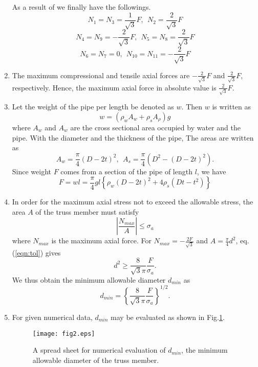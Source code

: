 \documentclass[10pt,a4j]{article}
\begin{document}
\begin{enumerate}
	As a result of we finally have the followings. 
	\[
		N_1=N_3=\frac{1}{\sqrt{3}}F ,\ \ N_2=\frac{2}{\sqrt{3}}F
	\]
	\[
		N_4=N_9=-\frac{2}{\sqrt{3}}F ,\ \ N_5=N_8=\frac{2}{\sqrt{3}}F
	\]
	\[
		N_6=N_7=0, \ \ N_{10}=N_{11}=-\frac{2}{\sqrt{3}}F
	\]
\item
	The maximum compressional and tensile axial forces are $-\frac{2}{\sqrt{3}}F$ 
	and $\frac{2}{\sqrt{3}}F$, respectively.
	Hence, the maximum axial force in absolute value is $\frac{2}{\sqrt{3}}F$.
\item
	Let the weight of the pipe per length be denoted as $w$. Then $w$ is written as 
	\begin{equation}
		w= \left( \rho_w A_w + \rho_s A_\rho \right)g
		\label{eqn:}
	\end{equation}
	where $A_w$ and $A_w$ are the cross sectional area occupied by 
	water and the pipe.
	With the diameter and the thickness of the pipe, The areas are written as 
	\begin{equation}
		A_w=\frac{\pi}{4}(D-2t)^2, \ \ A_s=\frac{\pi}{4}\left(D^2-(D-2t)^2\right).
		\label{eqn:}
	\end{equation}
	Since weight $F$ comes from a section of the pipe of length $l$, we have
	\begin{equation}
		F=wl=
		\frac{\pi}{4}gl
		\left\{ 
			\rho_w(D-2t)^2+ 4\rho_s\left(Dt-t^2\right)
		\right\}
		\label{eqn:F_explicit}
	\end{equation}
\item
	In order for the maximum axial stress not to exceed the allowable stress, the area 
	$A$ of the truss member must satisfy 
	\begin{equation}
		\left| \frac{N_{max}}{A}\right| \leq \sigma_a
		\label{eqn:tol}
	\end{equation}
	where $N_{max}$ is the maximum axial force.
	For $N_{max}=-\frac{2F}{\sqrt{3}}$ and $A=\frac{\pi}{4}d^2$, eq.(\ref{eqn:tol}) gives
	\begin{equation}
		d^2 \geq  \frac{8}{\sqrt{3}\pi} \frac{F}{\sigma_a}.
		\label{eqn:}
	\end{equation}
	We thus obtain the minimum allowable diameter $d_{min}$ as 
	\begin{equation}
		d_{min}=
		\left\{ \frac{8}{\sqrt{3}\pi} \frac{F}{\sigma_a}
		\right\}^{1/2}.
		\label{eqn:dmin}
	\end{equation}
\item
	For given numerical data, $d_{min}$ may be evaluated as shown in Fig.\ref{fig:fig4}.
	\begin{figure}[h]
	\begin{center}
	\texttt{[image: fig2.eps]} 
	\end{center}
	\caption{A spread sheet for numerical evaluation of $d_{min}$, the minimum allowable diameter of the truss member.} 
	\label{fig:fig4}
	\end{figure}
\end{enumerate}
\end{document}
